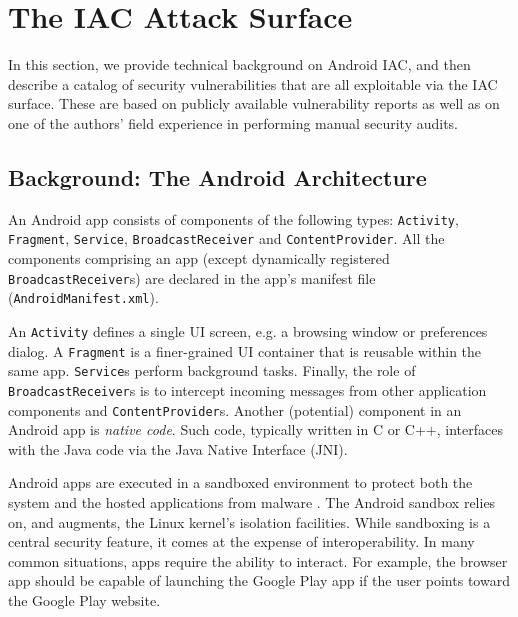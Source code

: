 \section{The IAC Attack Surface}\label{Se:surface}

In this section, we provide technical background on Android IAC, and then describe a catalog of security vulnerabilities that are all exploitable via the IAC surface. These are based on publicly available vulnerability reports \cite{XAS-CVE} as well as on one of the authors' field experience in performing manual security audits.

\subsection{Background: The Android Architecture}\label{Se:andarchitecture}

An Android app consists of components of the following types:
{\tt Activity}, {\tt Fragment}, {\tt Service},
{\tt BroadcastReceiver} and {\tt ContentProvider}. 
%
All the components comprising an app (except dynamically registered {\tt BroadcastReceiver}s)
are declared in the app's manifest
file (\texttt{AndroidManifest.xml}).

An {\tt Activity}
defines a single UI screen, e.g. a browsing window or preferences dialog. A {\tt Fragment} is
a finer-grained UI container that is reusable within the same app. {\tt Service}s perform background tasks. Finally, the role of {\tt BroadcastReceiver}s is to intercept incoming messages from other application components and {\tt ContentProvider}s.
%
Another (potential) component in an Android app is \textit{native code}. Such code,
typically written in C or C++, interfaces with the Java code via the Java Native Interface (JNI).

Android apps are executed in a sandboxed environment
to protect both the system and the hosted applications from
malware \cite{EOM:SP09}. 
%
%
The Android sandbox relies on, and augments, the Linux kernel's isolation
facilities.
%
%
While sandboxing is a central security feature, it comes at the expense of interoperability. In many common situations, apps require the ability to interact. For example, the browser app should be capable of launching the Google Play app if the user points toward the Google Play website. 

